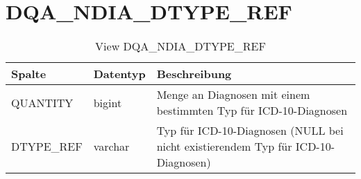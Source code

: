   \section{DQA\_NDIA\_DTYPE\_REF}

  \begin{table}[ht]
    \centering
    \caption{View DQA\_NDIA\_DTYPE\_REF}
    \label{tab:dqandiadtyperef}
    \begin{tabular}{||l|l|p{10cm}||}
      \hline
      Spalte & Datentyp & Beschreibung \\ [0.5ex] \hline \hline
QUANTITY & bigint & Menge an Diagnosen mit einem bestimmten Typ für ICD-10-Diagnosen \\ \hline
DTYPE\_REF & varchar & Typ für ICD-10-Diagnosen (NULL bei nicht existierendem Typ für ICD-10-Diagnosen)\\ \hline
    \end{tabular}
  \end{table}

